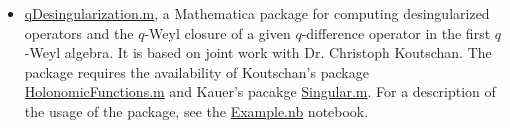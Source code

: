 \documentclass[a4paper,12pt]{article}
\begin{document}
\begin{CJK*}{UTF8}{gbsn}
\begin{itemize}
 \item \href{https://yzhang1616.github.io/qDesingularization.m}{qDesingularization.m}, a Mathematica
     package for computing desingularized operators and the $q$-Weyl closure of
     a given $q$-difference operator in
     the first $q$-Weyl algebra. It is based on joint work with Dr. Christoph
     Koutschan. The package requires the availability of Koutschan's package
     \href{http://www.risc.jku.at/research/combinat/software/ergosum/RISC/HolonomicFunctions.html}{HolonomicFunctions.m}
     and Kauer's pacakge \href{https://www.risc.jku.at/research/combinat/risc/software/Singular/index.html}{Singular.m}.
     For a description of the usage of the package, see the \href{https://yzhang1616.github.io/Example.nb}{Example.nb} notebook.
\end{itemize}


\end{CJK*}
\end{document}
